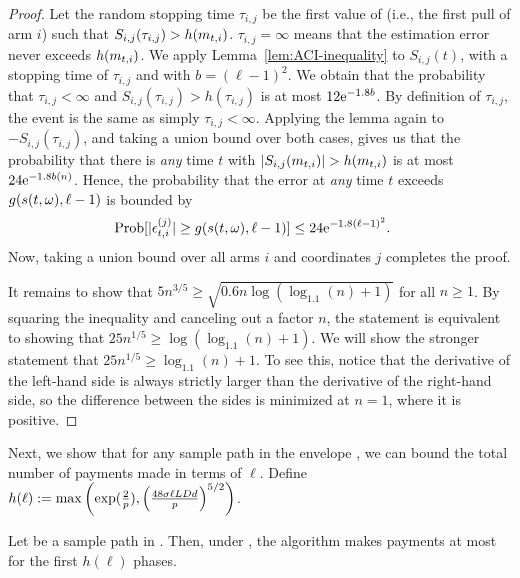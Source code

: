 \begin{proof}
Let the random stopping time $\tau_{i,j}$ be the first value of
 (i.e., the first pull of arm $i$) such that 
$S_{i,j}(\tau_{i,j}) > h(m_{t,i})$.
$\tau_{i,j} = \infty$ means that the estimation error never exceeds 
$h(m_{t,i})$.
We apply Lemma~\ref{lem:ACI-inequality}
to $S_{i,j}(t)$, with a stopping time of $\tau_{i,j}$ and
with $b = (\ell-1)^2$.
We obtain that the probability that $\tau_{i,j} < \infty$ and 
$S_{i,j}(\tau_{i,j}) > h(\tau_{i,j})$ is at most
$12 \mathrm{e}^{-1.8 b}$.
By definition of $\tau_{i,j}$, the event is the same as simply
$\tau_{i,j} < \infty$.
Applying the lemma again to $-S_{i,j}(\tau_{i,j})$,
and taking a union bound over both cases,
gives us that the probability that there is \emph{any} time $t$ with
$|S_{i,j}(m_{t,i})| > h (m_{t,i})$
is at most $24 \mathrm{e}^{-1.8 b(n)}$.
Hence, the probability that the error at \emph{any} time $t$ exceeds
$g(s(t,\omega), \ell-1)$ is bounded by 
\begin{align*}
\Prob{|\Err{t}{i}{j}| \geq g(s(t,\SP), \ell-1)}
& \leq 24 \e^{-1.8(\ell-1)^2}.
\end{align*}
Now, taking a union bound over all arms $i$ and
coordinates $j$ completes the proof.

It remains to show that
$5 n^{3/5} \geq \sqrt{0.6n \log(\log_{1.1}(n)+1)}$
for all $n \geq 1$.
By squaring the inequality and canceling out a factor $n$,
the statement is equivalent to showing that
$25 n^{1/5} \geq \log(\log_{1.1}(n)+1)$.
We will show the stronger statement that
$25 n^{1/5} \geq \log_{1.1}(n)+1$.  
To see this, notice that the derivative of the left-hand side is
always strictly larger than the derivative of the right-hand side,
so the difference between the sides is minimized at $n=1$,
where it is positive. 
\end{proof}

Next, we show that for any sample path \SP in the envelope \Env{\ell},
we can bound the total number of payments made in terms of $\ell$.
Define $h(\ell) := \max \left( \exp(\frac{2}{p}),
\left( \frac{48 \sigma \ell L D d}{p} \right)^{5/2}
\right)$.

\begin{lemma} \label{lem:envelope-payments}
Let \SP be a sample path in \Env{\ell}.
Then, under \SP, the algorithm makes payments at most for the first 
$h(\ell)$ phases. 
\end{lemma}

